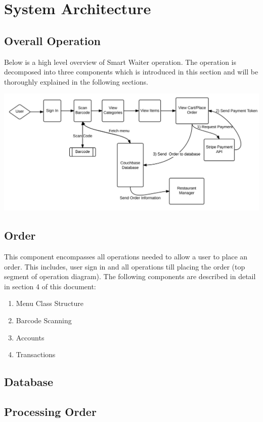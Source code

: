\documentclass[12pt, titlepage]{article}
\begin{document}
\section{System Architecture}

\subsection{Overall Operation}
Below is a high level overview of Smart Waiter operation. The operation is decomposed into three components which is introduced in this section and will be thoroughly explained in the following sections. 


\includegraphics[width=150mm,scale=0.5]{OverallOperation.png}


\subsection{Order}
This component encompasses all operations needed to allow a user to place an order. This includes, user sign in and all operations till placing the order (top segment of operation diagram). The following components are described in detail in section 4 of this document: 

 \begin{enumerate}
  \item Menu Class Structure
  \item Barcode Scanning 
  \item Accounts
  \item Transactions
\end{enumerate}

\subsection{Database}

\subsection{Processing Order}
\end{document}
